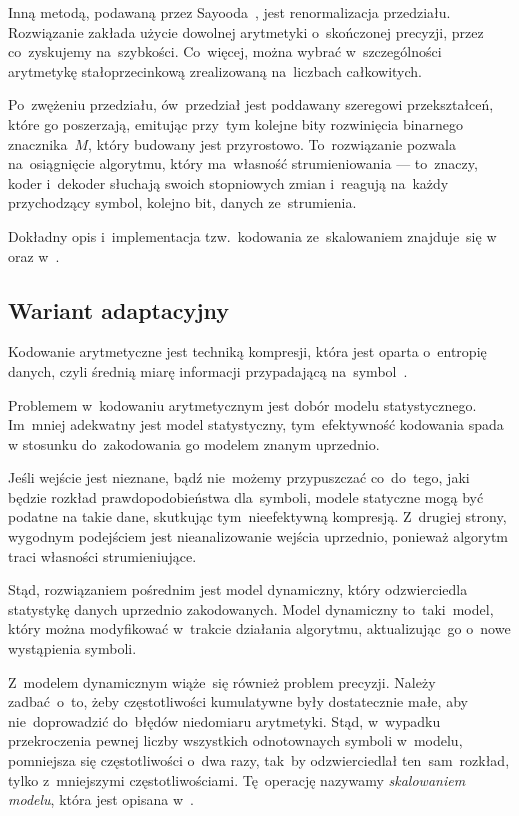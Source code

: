 \documentclass[../../thesis.tex]{subfiles}
\begin{document}
Inną metodą, podawaną przez Sayooda~\cite{Sayood:IDC}, jest renormalizacja przedziału.
Rozwiązanie zakłada użycie dowolnej arytmetyki o~skończonej precyzji, przez 
co~zyskujemy na~szybkości. Co~więcej, można wybrać w~szczególności arytmetykę stałoprzecinkową zrealizowaną 
na~liczbach całkowitych. 

Po~zwężeniu przedziału, ów~przedział jest poddawany
szeregowi przekształceń, które go poszerzają, emitując przy~tym kolejne bity
rozwinięcia binarnego znacznika~\( M \), który budowany jest przyrostowo.
To~rozwiązanie pozwala na~osiągnięcie algorytmu, który ma~własność strumieniowania
--- to~znaczy, koder i~dekoder słuchają swoich stopniowych zmian i~reagują na~każdy
przychodzący symbol, kolejno bit, danych ze~strumienia. 

Dokładny opis i~implementacja tzw.~kodowania ze~skalowaniem znajduje~się 
w~\cite{Sayood:IDC} oraz w~\cite{Witten:AC}.

\subsection{Wariant adaptacyjny}

Kodowanie arytmetyczne jest techniką kompresji, która jest oparta o~entropię danych,
czyli średnią miarę informacji przypadającą na~symbol~\cite{Sayood:IDC}. 

Problemem w~kodowaniu arytmetycznym jest dobór modelu statystycznego. 
Im~mniej adekwatny jest model statystyczny, tym~efektywność kodowania
spada w stosunku do~zakodowania go modelem znanym uprzednio. 

Jeśli wejście jest nieznane, bądź nie~możemy przypuszczać co~do~tego, jaki
będzie rozkład prawdopodobieństwa dla~symboli, modele statyczne
mogą być podatne na takie dane, skutkując tym~nieefektywną kompresją.
Z~drugiej strony, wygodnym podejściem jest nieanalizowanie wejścia uprzednio, ponieważ
algorytm traci własności strumieniujące.

Stąd, rozwiązaniem pośrednim jest model dynamiczny, który odzwierciedla 
statystykę danych uprzednio zakodowanych. Model dynamiczny to~taki~model,
który można modyfikować w~trakcie działania algorytmu, aktualizując~go
o~nowe wystąpienia symboli. 

Z~modelem dynamicznym wiąże~się również problem precyzji. Należy zadbać~o~to, 
żeby częstotliwości kumulatywne były dostatecznie małe, aby
nie~doprowadzić do~błędów niedomiaru arytmetyki. Stąd, w~wypadku
przekroczenia pewnej liczby wszystkich odnotownaych symboli w~modelu,
pomniejsza się częstotliwości o~dwa razy, tak~by odzwierciedlał 
ten~sam~rozkład, tylko z~mniejszymi częstotliwościami. Tę~operację
nazywamy \emph{skalowaniem modelu}, która jest opisana w~\cite{Witten:AC}.
\end{document}
